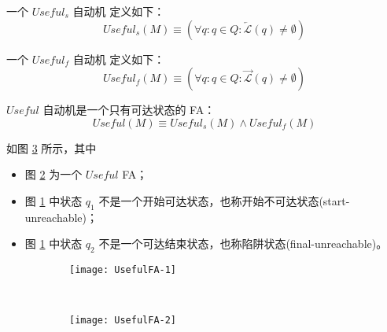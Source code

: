 \begin{definition}
    一个 $Useful_s$ 自动机 定义如下： 
    \[ Useful_s (M) \equiv ( \forall q:q \in Q : \overleftarrow{\mathcal{L}} (q) \not= \emptyset ) \]
\end{definition}

\begin{definition}
    一个 $Useful_f$ 自动机 定义如下： 
    \[ Useful_f (M) \equiv ( \forall q:q \in Q : \overrightarrow{\mathcal{L}} (q) \not= \emptyset ) \]
\end{definition}

\begin{definition}
    $Useful$ 自动机是一个只有可达状态的 FA：
    \[ Useful (M) \equiv Useful_s (M) \land Useful_f (M) \]
\end{definition}

\begin{example}
    如图 \ref{fig:UsefulFA} 所示，其中
    \begin{itemize}
        \item 图 \ref{fig:UsefulFA-2} 为一个 $Useful$ FA；
        \item 图 \ref{fig:UsefulFA-1} 中状态 $q_1$ 不是一个开始可达状态，也称开始不可达状态(start-unreachable)；
        \item 图 \ref{fig:UsefulFA-1} 中状态 $q_2$ 不是一个可达结束状态，也称陷阱状态(final-unreachable)\cite{watson1993taxonomyb}。
    \end{itemize}
\end{example}

\begin{figure}[!htbp]
    \centering
    \begin{subfigure}[b]{0.45\textwidth}
        \texttt{[image: UsefulFA-1]}
        \caption{}
        \label{fig:UsefulFA-1}
    \end{subfigure}
    ~
    \begin{subfigure}[b]{0.45\textwidth}
        \texttt{[image: UsefulFA-2]}
        \caption{}
        \label{fig:UsefulFA-2}
    \end{subfigure}
    \caption{}
    \label{fig:UsefulFA}
\end{figure}

